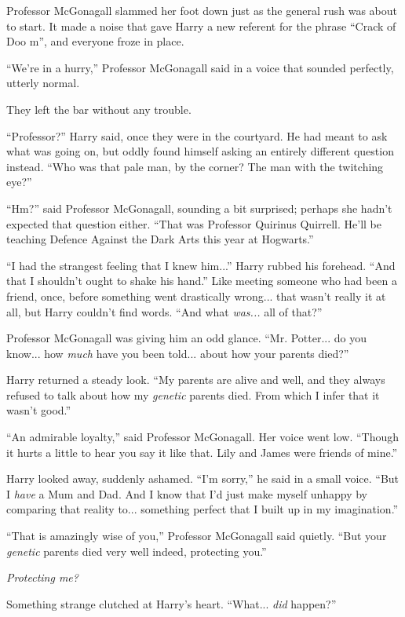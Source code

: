 Professor McGonagall slammed her foot down just as the general rush was about to start. It made a noise that gave Harry a new referent for the phrase ``Crack of Doo m'', and everyone froze in place.

``We're in a hurry,'' Professor McGonagall said in a voice that sounded perfectly, utterly normal.

They left the bar without any trouble.

``Professor?'' Harry said, once they were in the courtyard. He had meant to ask what was going on, but oddly found himself asking an entirely different question instead. ``Who was that pale man, by the corner? The man with the twitching eye?''

``Hm?'' said Professor McGonagall, sounding a bit surprised; perhaps she hadn't expected that question either. ``That was Professor Quirinus Quirrell. He'll be teaching Defence Against the Dark Arts this year at Hogwarts.''

``I had the strangest feeling that I knew him...'' Harry rubbed his forehead. ``And that I shouldn't ought to shake his hand.'' Like meeting someone who had been a friend, once, before something went drastically wrong... that wasn't really it at all, but Harry couldn't find words. ``And what \emph{was...} all of that?''

Professor McGonagall was giving him an odd glance. ``Mr. Potter... do you know... how \emph{much} have you been told... about how your parents died?''

Harry returned a steady look. ``My parents are alive and well, and they always refused to talk about how my \emph{genetic} parents died. From which I infer that it wasn't good.''

``An admirable loyalty,'' said Professor McGonagall. Her voice went low. ``Though it hurts a little to hear you say it like that. Lily and James were friends of mine.''

Harry looked away, suddenly ashamed. ``I'm sorry,'' he said in a small voice. ``But I \emph{have} a Mum and Dad. And I know that I'd just make myself unhappy by comparing that reality to... something perfect that I built up in my imagination.''

``That is amazingly wise of you,'' Professor McGonagall said quietly. ``But your \emph{genetic} parents died very well indeed, protecting you.''

\emph{Protecting me?}

Something strange clutched at Harry's heart. ``What... \emph{did} happen?''

